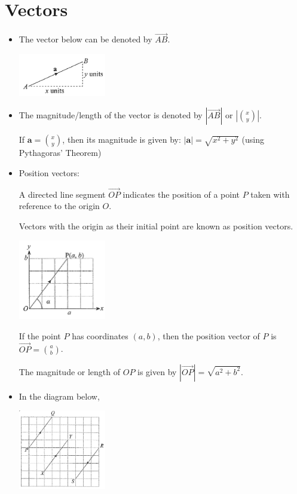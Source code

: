 \documentclass[twocolumn]{article}
\begin{document}
\section*{Vectors}

\begin{itemize}
	
\item  The vector below can be denoted by $\overrightarrow{A B}$.

\includegraphics[width=0.3\textwidth]{201.png}

\item The magnitude/length of the vector is denoted by $|\overrightarrow{A B}|$ or $\left|\binom{x}{y}\right|$.

If $\mathbf{a}=\binom{x}{y}$, then its magnitude is given by:
$|\mathbf{a}|=\sqrt{x^2+y^2}$ (using Pythagoras' Theorem)

\item Position vectors:

A directed line segment $\overrightarrow{O P}$ indicates the position of a point $P$ taken with reference to the origin $O$. 

Vectors with the origin as their initial point are known as position vectors.

\includegraphics[width=0.3\textwidth]{202.png}

If the point $P$ has coordinates $(a, b)$, then the position vector of $P$ is $\overrightarrow{O P}=\binom{a}{b}$.

The magnitude or length of $O P$ is given by $|\overrightarrow{O P}|=\sqrt{a^2+b^2}$.

\item In the diagram below,

\includegraphics[width=0.3\textwidth]{203.png}


\end{itemize}
\end{document}
